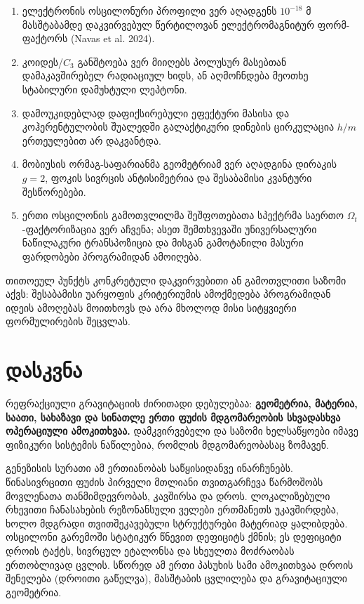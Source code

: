 \documentclass[11pt,a4paper]{article}
\begin{document}
\begin{enumerate}[label=\arabic*.]
\item ელექტრონის ოსცილონური პროფილი ვერ აღადგენს $10^{-18}\text{ მ}$ მასშტაბამდე დაკვირვებულ წერტილოვან ელექტრომაგნიტურ ფორმ-ფაქტორს (Navas et al. 2024).
\item კოიდეს/$C_3$ განშტოება ვერ მიიღებს პოლუსურ მასებთან დამაკავშირებელ რადიაციულ ხიდს, ან აღმოჩნდება მეოთხე სტაბილური დამუხტული ლეპტონი.
\item დამოუკიდებლად დაფიქსირებული ეფექტური მასისა და კოჰერენტულობის შუალედში გალაქტიკური დინების ცირკულაცია $h/m$ ერთეულებით არ დაკვანტდა.
\item მობიუსის ორმაგ-საფარიანმა გეომეტრიამ ვერ აღადგინა დირაკის $g=2$, ფოკის სივრცის ანტისიმეტრია და შესაბამისი კვანტური შესწორებები.
\item ერთი ოსცილონის გამოთვლილმა შეშფოთებათა სპექტრმა საერთო $\Omega_t$-ფაქტორიზაცია ვერ აჩვენა; ასეთ შემთხვევაში უნივერსალური ნაწილაკური ტრანსპოზიცია და მისგან გამოტანილი მასური ფარდობები პროგრამიდან ამოიღება.

\end{enumerate}
თითოეულ პუნქტს კონკრეტული დაკვირვებითი ან გამოთვლითი საზომი აქვს: შესაბამისი უარყოფის კრიტერიუმის ამოქმედება პროგრამიდან იდეის ამოღებას მოითხოვს და არა მხოლოდ მისი სიტყვიერი ფორმულირების შეცვლას.


\section*{დასკვნა}

რეფრაქციული გრავიტაციის ძირითადი დებულებაა: \textbf{გეომეტრია, მატერია, საათი, სახაზავი და სინათლე ერთი ფუძის მდგომარეობის სხვადასხვა ოპერაციული ამოკითხვაა.} დამკვირვებელი და საზომი ხელსაწყოები იმავე ფიზიკური სისტემის ნაწილებია, რომლის მდგომარეობასაც ზომავენ.

გენეზისის სურათი ამ ერთიანობას საწყისიდანვე ინარჩუნებს. წინასივრცითი ფუძის პირველი მთლიანი თვითგარჩევა წარმოშობს მოვლენათა თანმიმდევრობას, კავშირსა და დროს. ლოკალიზებული რხევითი ჩანასახების რეზონანსული ველები ერთმანეთს უკავშირდება, ხოლო მდგრადი თვითშეკავებული სტრუქტურები მატერიად ყალიბდება. ოსცილონი გარემოში სტატიკურ წნევით დეფიციტს ქმნის; ეს დეფიციტი დროის ტაქტს, სივრცულ ეტალონსა და სხეულთა მოძრაობას ერთობლივად ცვლის. სწორედ ამ ერთი პასუხის სამი ამოკითხვაა დროის შენელება (დროითი გაწელვა), მასშტაბის ცვლილება და გრავიტაციული გეომეტრია.
\end{document}
